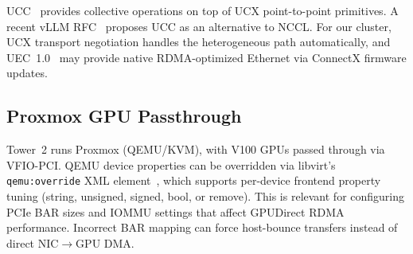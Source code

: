 \documentclass[11pt,letterpaper]{article}
\theoremstyle{definition}
\begin{document}
UCC~\cite{ucc} provides collective operations on top of UCX point-to-point primitives. A recent vLLM RFC~\cite{vllm-ucc-rfc} proposes UCC as an alternative to NCCL. For our cluster, UCX transport negotiation handles the heterogeneous path automatically, and UEC~1.0~\cite{uec2025} may provide native RDMA-optimized Ethernet via ConnectX firmware updates.

\subsection{Proxmox GPU Passthrough}

Tower~2 runs Proxmox (QEMU/KVM), with V100 GPUs passed through via VFIO-PCI. QEMU device properties can be overridden via libvirt's \texttt{qemu:override} XML element~\cite{libvirt-qemu}, which supports per-device frontend property tuning (string, unsigned, signed, bool, or remove). This is relevant for configuring PCIe BAR sizes and IOMMU settings that affect GPUDirect RDMA performance. Incorrect BAR mapping can force host-bounce transfers instead of direct NIC$\to$GPU DMA.




\end{document}
